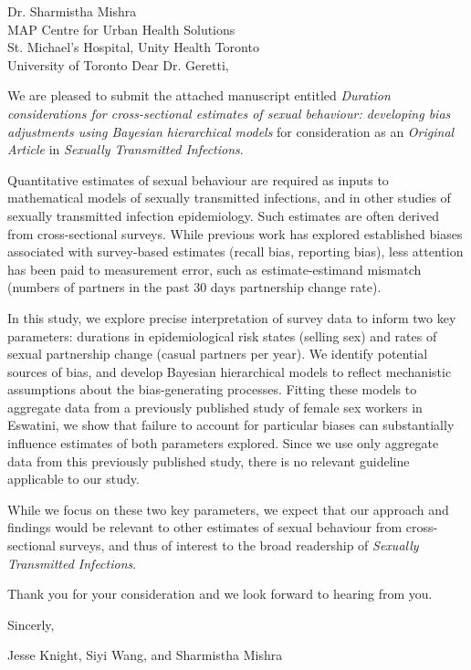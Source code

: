 \address{
  Dr. Anna Maria Geretti\\
  Editor-in-Chief\\
  Sexually Transmitted Infections
}{Dr. Sharmistha Mishra\\
  MAP Centre for Urban Health Solutions\\
  St. Michael's Hospital, Unity Health Toronto\\
  University of Toronto}
Dear Dr. Geretti,
\par
We are pleased to submit the attached manuscript entitled
\emph{Duration considerations for cross-sectional estimates of sexual behaviour:
  developing bias adjustments using Bayesian hierarchical models}
for consideration as an \emph{Original Article} in \emph{Sexually Transmitted Infections}.
\par
Quantitative estimates of sexual behaviour are required
as inputs to mathematical models of sexually transmitted infections,
and in other studies of sexually transmitted infection epidemiology.
Such estimates are often derived from cross-sectional surveys.
While previous work has explored established biases associated with survey-based estimates
(\eg recall bias, reporting bias),
less attention has been paid to measurement error, such as estimate-estimand mismatch
(\eg numbers of partners in the past 30 days \vs partnership change rate).
\par
In this study, we explore precise interpretation of survey data to inform two key parameters:
durations in epidemiological risk states (\eg selling sex) and
rates of sexual partnership change (\eg casual partners per year).
We identify potential sources of bias,
and develop Bayesian hierarchical models to reflect
mechanistic assumptions about the bias-generating processes.
Fitting these models to aggregate data from
a previously published study of female sex workers in Eswatini,
we show that failure to account for particular biases can
substantially influence estimates of both parameters explored.
Since we use only aggregate data from this previously published study,
there is no relevant guideline applicable to our study.
\par
While we focus on these two key parameters,
we expect that our approach and findings would be relevant to
other estimates of sexual behaviour from cross-sectional surveys,
and thus of interest to the broad readership of \emph{Sexually Transmitted Infections}.
\par
Thank you for your consideration and we look forward to hearing from you.
\medskip\par
Sincerly,
\par
Jesse Knight, Siyi Wang, and Sharmistha Mishra
